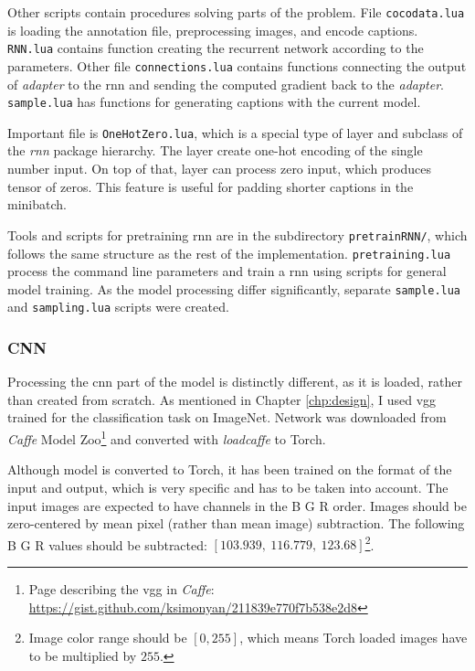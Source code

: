 Other scripts contain procedures solving parts of the problem. File \texttt{cocodata.lua} is loading the annotation file, preprocessing images, and encode captions. \texttt{RNN.lua} contains function creating the recurrent network according to the parameters. Other file \texttt{connections.lua} contains functions connecting the output of \emph{adapter} to the \gls{rnn} and sending the computed gradient back to the \emph{adapter}. \texttt{sample.lua} has functions for generating captions with the current model.

Important file is \texttt{OneHotZero.lua}, which is a special type of layer and subclass of the \emph{rnn} package hierarchy. The layer create one-hot encoding of the single number input. On top of that, layer can process zero input, which produces tensor of zeros. This feature is useful for padding shorter captions in the minibatch.

Tools and scripts for pretraining \gls{rnn} are in the subdirectory \texttt{pretrainRNN/}, which follows the same structure as the rest of the implementation. \texttt{pretraining.lua} process the command line parameters and train a \gls{rnn} using scripts for general model training. As the model processing differ significantly, separate \texttt{sample.lua} and \texttt{sampling.lua} scripts were created.

\subsubsection{CNN}

Processing the \gls{cnn} part of the model is distinctly different, as it is loaded, rather than created from scratch. As mentioned in Chapter \ref{chp:design}, I used \gls{vgg}~\cite{DBLP:journals/corr/SimonyanZ14a} trained for the classification task on ImageNet. Network was downloaded from \emph{Caffe} Model Zoo\footnote{Page describing the \gls{vgg} in \emph{Caffe}: \url{https://gist.github.com/ksimonyan/211839e770f7b538e2d8}} and converted with \emph{loadcaffe} to Torch.

Although model is converted to Torch, it has been trained on the format of the input and output, which is very specific and has to be taken into account. The input images are expected to have channels in the B G R order. Images should be zero-centered by mean pixel (rather than mean image) subtraction. The following B G R values should be subtracted: $ [103.939,\ 116.779,\ 123.68] $\footnote{Image color range should be $ [0 , 255] $, which means Torch loaded images have to be multiplied by $ 255 $.}.

